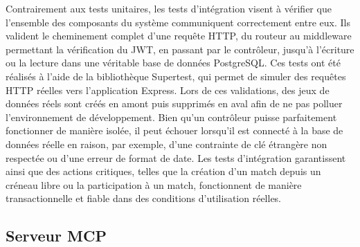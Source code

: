 \documentclass[12pt]{article}
\begin{document}
Contrairement aux tests unitaires, les tests d'intégration visent à vérifier que l'ensemble des composants du système communiquent correctement entre eux. Ils valident le cheminement complet d'une requête HTTP, du routeur au middleware permettant la vérification du JWT, en passant par le contrôleur, jusqu'à l'écriture ou la lecture dans une véritable base de données PostgreSQL. Ces tests ont été réalisés à l'aide de la bibliothèque Supertest, qui permet de simuler des requêtes HTTP réelles vers l'application Express. Lors de ces validations, des jeux de données réels sont créés en amont puis supprimés en aval afin de ne pas polluer l'environnement de développement. Bien qu'un contrôleur puisse parfaitement fonctionner de manière isolée, il peut échouer lorsqu'il est connecté à la base de données réelle en raison, par exemple, d'une contrainte de clé étrangère non respectée ou d'une erreur de format de date. Les tests d'intégration garantissent ainsi que des actions critiques, telles que la création d'un match depuis un créneau libre ou la participation à un match, fonctionnent de manière transactionnelle et fiable dans des conditions d'utilisation réelles.
\subsection{Serveur MCP}
\end{document}
